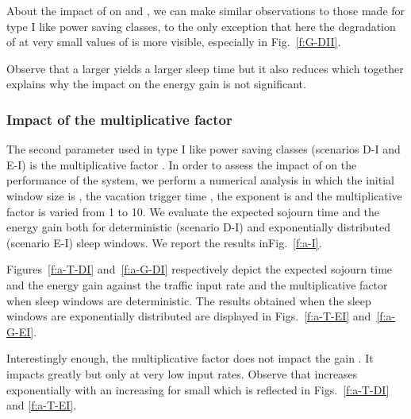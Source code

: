 \documentclass[journal]{IEEEtran}
\begin{document}
About the impact of  on  and , we can make similar observations to those made for type I like power saving classes, to the only exception that here the degradation of  at very small values of  is more visible, especially in Fig.~\ref{f:G-DII}. 

Observe that a larger  yields a larger sleep time but it also reduces  which together explains why the impact on the energy gain is not significant.
\subsubsection{Impact of the multiplicative factor }
\label{s:a}
The second parameter used in type I like power saving classes (scenarios D-I and E-I) is the multiplicative factor . In order to assess the impact of  on the performance of the system, we perform a numerical analysis in which the initial window size is , the vacation trigger time , the exponent is  and the multiplicative factor  is varied from 1 to 10. We evaluate the expected sojourn time  and the energy gain  both for deterministic (scenario D-I) and exponentially distributed (scenario E-I) sleep windows. We report the results inFig.~\ref{f:a-I}.
\begin{figure*}[tb]
\begin{center}
\caption{Impact of  on  and  with either deterministic or exponential .
\label{f:a-I}}
\end{center}
\end{figure*}
Figures~\ref{f:a-T-DI} and~\ref{f:a-G-DI} respectively depict the expected sojourn time  and the energy gain  against the traffic input rate  and the multiplicative factor  when sleep windows are deterministic. The results obtained when the sleep windows are exponentially distributed are displayed in Figs.~\ref{f:a-T-EI} and~\ref{f:a-G-EI}. 

Interestingly enough, the multiplicative factor  does not impact the gain . It impacts greatly  but only at very low input rates. Observe that  increases exponentially with an increasing  for small
 which is reflected in Figs.~\ref{f:a-T-DI} and \ref{f:a-T-EI}. 
\end{document}
